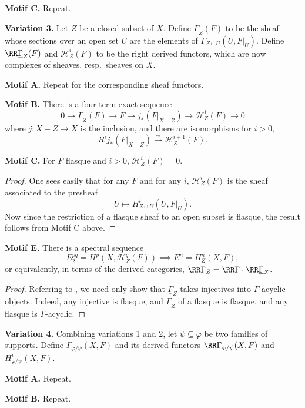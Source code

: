 \medskip\noindent\textbf{Motif C.} Repeat.

\medskip\noindent\textbf{Variation 3.}
Let $Z$ be a closed subset of $X$. Define $\underline{\Gamma}_Z(F)$ to be the sheaf whose sections over an open set $U$ are the elements of $\Gamma_{Z\cap U}(U,F|_U)$. Define $\RR\underline{\Gamma}_Z(F)$ and $\mathcal{H}_Z^i(F)$ to be the right derived functors, which are now complexes of sheaves, resp.\ sheaves on $X$.

\medskip\noindent\textbf{Motif A.} Repeat for the corresponding sheaf functors.

\medskip\noindent\textbf{Motif B.} There is a four-term exact sequence
\[
0\longrightarrow \underline{\Gamma}_Z(F)\longrightarrow F\longrightarrow j_*(F|_{X-Z})\longrightarrow \mathcal{H}^1_Z(F)\longrightarrow 0
\]
where $j\colon X-Z\to X$ is the inclusion, and there are isomorphisms for $i>0$,
\[
R^i j_*(F|_{X-Z}) \xrightarrow{\sim} \mathcal{H}_Z^{i+1}(F).
\]

\medskip\noindent\textbf{Motif C.} For $F$ flasque and $i>0$, $\mathcal{H}_Z^{i}(F)=0$.
\begin{proof}
One sees easily that for any $F$ and for any $i$, $\mathcal{H}^{i}_Z(F)$ is the sheaf associated to the presheaf
\[
U\longmapsto H_{Z\cap U}^{i}(U,F|_U).
\]
Now since the restriction of a flasque sheaf to an open subset is flasque, the result follows from Motif C above.
\end{proof}

\medskip\noindent\textbf{Motif E.} There is a spectral sequence
\[
E_2^{pq}=H^p(X, \mathcal{H}_Z^q(F))\implies E^n=H_Z^n(X,F),
\]
or equivalently, in terms of the derived categories, $\RR\Gamma_Z = \RR\Gamma\cdot \RR\underline{\Gamma}_Z$.
\begin{proof}
Referring to , we need only show that $\underline{\Gamma}_Z$ takes injectives into $\Gamma$-acyclic objects. Indeed, any injective is flasque, and $\underline{\Gamma}_Z$ of a flasque is flasque, and any flasque is $\Gamma$-acyclic.
\end{proof}

\medskip\noindent\textbf{Variation 4.}
Combining variations 1 and 2, let $\psi\subseteq\varphi$ be two families of supports. Define $\Gamma_{\varphi/\psi}(X,F)$ and its derived functors $\RR\Gamma_{\varphi/\psi}(X,F)$ and $H^i_{\varphi/\psi}(X,F)$.

\medskip\noindent\textbf{Motif A.} Repeat.

\medskip\noindent\textbf{Motif B.} Repeat.

